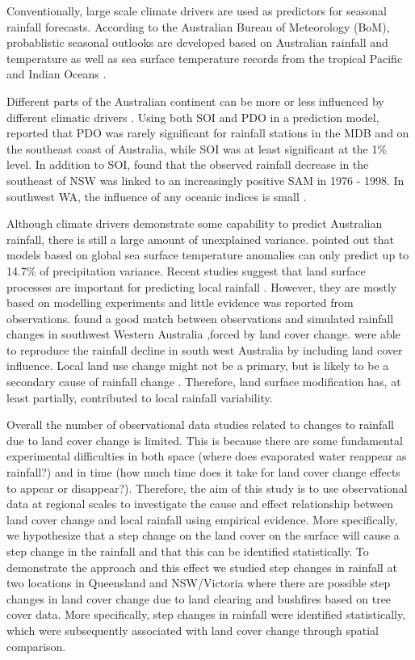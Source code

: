 \documentclass[authoryear,preprint,review,12pt]{elsarticle}
\begin{document}
Conventionally, large scale climate drivers are used as predictors for seasonal rainfall forecasts. According to the Australian Bureau of Meteorology (BoM), probablistic seasonal outlooks are developed based on Australian rainfall and temperature as well as sea surface temperature records from the tropical Pacific and Indian Oceans \citep{BoM2012c}. 

Different parts of the Australian continent can be more or less influenced by different climatic drivers \citep{Mla2008}. Using both SOI and PDO in a prediction model, \citet{Kamruzzaman2011} reported that PDO was rarely significant for rainfall stations in the MDB and on the southeast coast of Australia, while SOI was at least significant at the 1\% level. In addition to SOI, \citet{Speer2011} found that the observed rainfall decrease in the southeast of NSW was linked to an increasingly positive SAM in 1976 - 1998. In southwest WA, the influence of any oceanic indices is small \citep{Smith2012}.

Although climate drivers demonstrate some capability to predict Australian rainfall, there is still a large amount of unexplained variance. \citet{Westra2010} pointed out that models based on global sea surface temperature anomalies can only predict up to 14.7\% of precipitation variance. Recent studies suggest that land surface processes are important for predicting local rainfall \citep[e.g.][]{Ma2011,Zeng2012, pitman_scale_2016, saha_investigating_2016}. However, they are mostly based on modelling experiments and little evidence was reported from observations. \citet{Pitman2004} found a good match between observations and simulated rainfall changes in southwest Western Australia ,forced by land cover change. \citet{Timbal2006} were able to reproduce the rainfall decline in south west Australia by including land cover influence. Local land use change might not be a primary, but is likely to be a secondary cause of rainfall change \citep{Nicholls2006}. Therefore, land surface modification has, at least partially, contributed to local rainfall variability.

Overall the number of observational data studies related to changes to rainfall due to land cover change is limited. This is because there are some fundamental experimental difficulties in both space (where does evaporated water reappear as rainfall?) and in time (how much time does it take for land cover change effects to appear or disappear?). Therefore, the aim of this study is to use observational data at regional scales to investigate the cause and effect relationship between land cover change and local rainfall using empirical evidence. More specifically, we hypothesize that a step change on the land cover on the surface will cause a step change in the rainfall and that this can be identified statistically. To demonstrate the approach and this effect we studied step changes in rainfall at two locations in Queensland and NSW/Victoria where there are possible step changes in land cover change due to land clearing and bushfires based on tree cover data. More specifically,  step changes in rainfall were identified statistically, which were subsequently associated with land cover change through spatial comparison.
\end{document}
